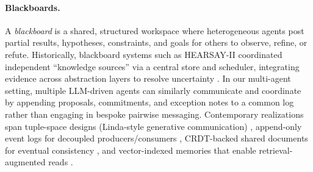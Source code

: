\paragraph{Blackboards.} A \emph{blackboard} is a shared, structured workspace where heterogeneous agents post partial results, hypotheses, constraints, and goals for others to observe, refine, or refute. Historically, blackboard systems such as HEARSAY-II coordinated independent “knowledge sources” via a central store and scheduler, integrating evidence across abstraction layers to resolve uncertainty \citep{Erman1980,Nii1986a,Nii1986b}. In our multi-agent setting, multiple LLM-driven agents can similarly communicate and coordinate by appending proposals, commitments, and exception notes to a common log rather than engaging in bespoke pairwise messaging. Contemporary realizations span tuple-space designs (Linda-style generative communication) \citep{Gelernter1985}, append-only event logs for decoupled producers/consumers \citep{Kreps2011}, CRDT-backed shared documents for eventual consistency \citep{Shapiro2011}, and vector-indexed memories that enable retrieval-augmented reads \citep{Lewis2020}.

